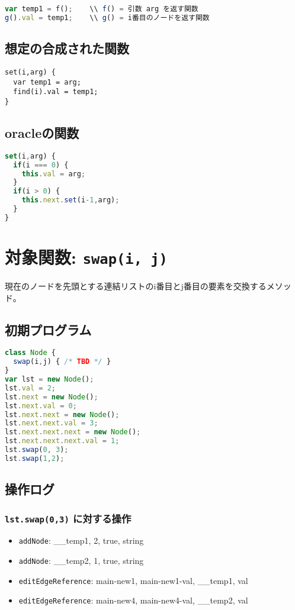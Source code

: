 \documentclass{article}
\begin{document}
\begin{lstlisting}[language=JavaScript]
var temp1 = f();    \\ f() = 引数 arg を返す関数
g().val = temp1;    \\ g() = i番目のノードを返す関数
\end{lstlisting}

\subsection{想定の合成された関数}
\begin{lstlisting}
set(i,arg) {
  var temp1 = arg;
  find(i).val = temp1;
}
\end{lstlisting}

\subsection{oracleの関数}
\begin{lstlisting}[language=JavaScript]
set(i,arg) {
  if(i === 0) {
    this.val = arg;
  }
  if(i > 0) {
    this.next.set(i-1,arg);
  }
}
\end{lstlisting}




\section{対象関数: \texttt{swap(i, j)}}
現在のノードを先頭とする連結リストのi番目とj番目の要素を交換するメソッド。

\subsection{初期プログラム}

\begin{lstlisting}[language=JavaScript]
class Node {
  swap(i,j) { /* TBD */ }
}
var lst = new Node(); 
lst.val = 2;
lst.next = new Node();
lst.next.val = 0;
lst.next.next = new Node(); 
lst.next.next.val = 3;
lst.next.next.next = new Node(); 
lst.next.next.next.val = 1;
lst.swap(0, 3);
lst.swap(1,2);
\end{lstlisting}

\subsection{操作ログ}

\subsubsection{\texttt{lst.swap(0,3)} に対する操作}
\begin{itemize}
  \item \texttt{addNode}: \_\_temp1, 2, true, string
  \item \texttt{addNode}: \_\_temp2, 1, true, string
  \item \texttt{editEdgeReference}: main-new1, main-new1-val, \_\_temp1, val
  \item \texttt{editEdgeReference}: main-new4, main-new4-val, \_\_temp2, val
\end{itemize}
\end{document}
